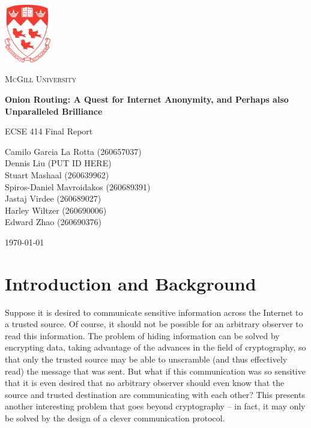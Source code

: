 \documentclass[10pt]{report}
\begin{document}
\begin{titlepage}
    \begin{center}
        \includegraphics[width=0.15\textwidth]{images/McGill.pdf}~\par\vspace{1cm}
        {\scshape\LARGE McGill University \par}
        \vspace{1cm}
        {\huge\bfseries Onion Routing: A Quest for Internet Anonymity, and Perhaps also Unparalleled Brilliance\par}
        \vspace{1.5cm}
        {\Large ECSE 414 Final Report\par}
        \vspace{2cm}
        {\Large Camilo Garcia La Rotta (260657037)\\}
        {\Large Dennis Liu (PUT ID HERE)\\}
        {\Large Stuart Mashaal (260639962)\\}
        {\Large Spiros-Daniel Mavroidakos (260689391)\\}
        {\Large Jastaj Virdee (260689027)\\}
        {\Large Harley Wiltzer (260690006)\\}
        {\Large Edward Zhao (260690376)\\}
        \vfill
        {\large \today\par}
    \end{center}
\end{titlepage}

\tableofcontents

\doublespacing


\chapter{Introduction and Background}
Suppose it is desired to communicate sensitive information across the Internet to a trusted source.
Of course, it should not be possible for an arbitrary observer to read this information. The problem
of hiding information can be solved by encrypting data, taking advantage of the advances in the
field of cryptography, so that only the trusted source may be able to unscramble (and thus
effectively read) the message that was sent. But what if this communication was so sensitive that it
is even desired that no arbitrary observer should even know that the source and trusted destination
are communicating with each other? This presents another interesting problem that goes beyond
cryptography -- in fact, it may only be solved by the design of a clever communication protocol.\\
\end{document}

